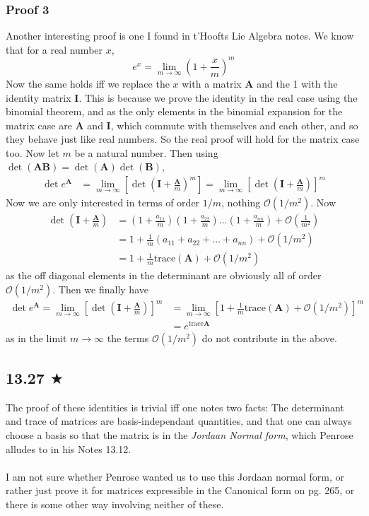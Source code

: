 \subsubsection*{Proof 3}
Another interesting proof is one I found in t'Hoofts Lie Algebra notes. We know that for a real number $x$, $$e^x=\lim_{m\to \infty} \left (1+\frac{x}{m}\right)^m$$
Now the same holds iff we replace the $x$ with a matrix \textbf{A} and the 1 with the identity matrix \textbf{I}. This is because we prove the identity in the real case using the binomial theorem, and as the only elements in the binomial expansion for the matrix case are \textbf{A} and \textbf{I}, which commute with themselves and each other, and so they behave just like real numbers. So the real proof will hold for the matrix case too. Now let $m$ be a natural number. Then using $\det (\textbf{A}\textbf{B})=\det (\textbf{A})\det(\textbf{B})$,
\begin{align*}
\det e^\textbf{A}&= \lim_{m\to \infty}\left[ \det \left (\textbf{I}+\frac{\textbf{A}}{m}\right)^m\right]=\lim_{m\to \infty}\left[ \det \left (\textbf{I}+\frac{\textbf{A}}{m}\right)\right]^m
\end{align*}
Now we are only interested in terms of order $1/m$, nothing $\mathcal{O}(1/m^2)$. Now 
\begin{align*}
\det \left (\textbf{I}+\frac{\textbf{A}}{m}\right)&=(1+\frac{a_{11}}{m})(1+\frac{a_{22}}{m})\ldots (1+\frac{a_{nn}}{m})+\mathcal{O}(\frac{1}{m^2})\\
&=1+\frac{1}{m}\left(a_{11}+a_{22}+\ldots+a_{nn}\right)+\mathcal{O}(1/m^2)\\
&=1+\frac{1}{m}\text{trace}(\textbf{A})+\mathcal{O}(1/m^2)
\end{align*}
as the off diagonal elements in the determinant are obviously all of order $\mathcal{O}(1/m^2)$. Then we finally have 
\begin{align*}
\det e^\textbf{A}=\lim_{m\to \infty}\left[ \det \left (\textbf{I}+\frac{\textbf{A}}{m}\right)\right]^m&=\lim_{m\to \infty}\left[ 1+\frac{1}{m}\text{trace}(\textbf{A})+\mathcal{O}(1/m^2)\right]^m\\
&=e^{\text{trace}\mathbf{A}}
\end{align*}
as in the limit $m\to \infty$ the terms $\mathcal{O}(1/m^2)$ do not contribute in the above.


\subsection{13.27 $\bigstar$}
The proof of these identities is trivial iff one notes two facts: The determinant and trace of matrices are basis-independant quantities, and that one can always choose a basis so that the matrix is in the \emph{Jordaan Normal form}, which Penrose alludes to in his Notes 13.12. \\ \\
I am not sure whether Penrose wanted us to use this Jordaan normal form, or rather just prove it for matrices expressible in the Canonical form on pg. 265, or there is some other way involving neither of these.





